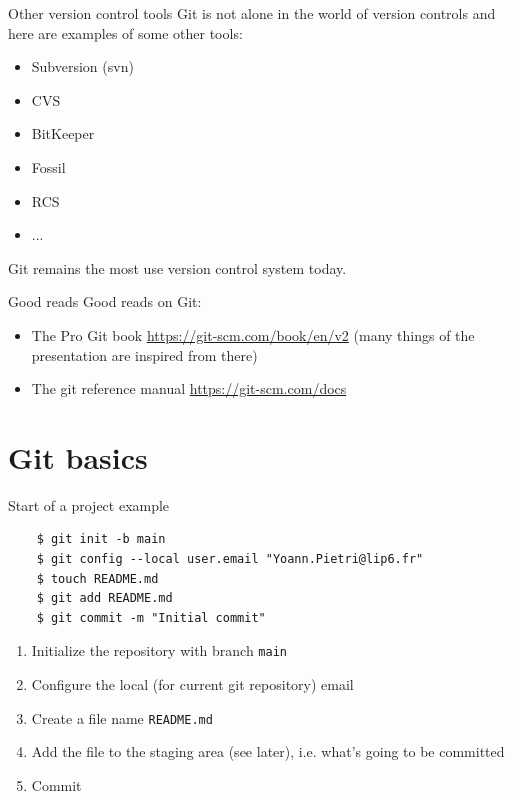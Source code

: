 \documentclass[10pt,aspectratio=169]{beamer}
\begin{document}
\begin{frame}{Other version control tools}
    Git is not alone in the world of version controls and here are examples of some other tools:
    \begin{itemize}
        \item Subversion (svn)
        \item CVS
        \item BitKeeper
        \item Fossil
        \item RCS
        \item ...
    \end{itemize}

    Git remains the most use version control system today.
\end{frame}

\begin{frame}[fragile]{Good reads}
    Good reads on Git:

    \begin{itemize}
        \item The Pro Git book \url{https://git-scm.com/book/en/v2} (many things of the presentation are inspired from there)
        \item The git reference manual \url{https://git-scm.com/docs}

    \end{itemize}
\end{frame}

\section{Git basics}

\begin{frame}[fragile]{Start of a project example}
    \begin{verbatim}
    $ git init -b main
    $ git config --local user.email "Yoann.Pietri@lip6.fr"
    $ touch README.md
    $ git add README.md
    $ git commit -m "Initial commit"
      \end{verbatim}
    \begin{multicols}{2}
        \begin{enumerate}
            \item Initialize the repository with branch \verb|main|
            \item Configure the local (for current git repository) email
            \item Create a file name \verb|README.md|
            \item Add the file to the staging area (see later), i.e. what's going to be committed
            \item Commit
        \end{enumerate}
    \end{multicols}
\end{frame}
\end{document}
